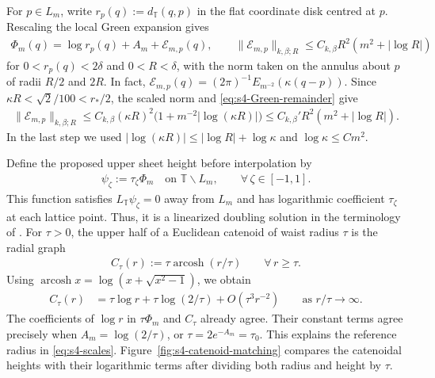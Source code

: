 \documentclass[a4paper,11pt,oneside,reqno]{amsart}
\numberwithin{equation}{section}
\theoremstyle{definition}
\begin{document}
For $p\in L_m$, write $r_p(q):=d_{\mathbb T}(q,p)$ in
the flat coordinate disk centred at $p$. Rescaling the local
Green expansion gives
%
\begin{align}
    \label{eq:s4-physical-expansion}
    \Phi_m(q)=\log r_p(q)+A_m+\mathcal E_{m,p}(q),
    \qquad
    \|\mathcal E_{m,p}\|_{k,\beta;R}
    \leq C_{k,\beta}R^2(m^2+|\log R|)
\end{align}
%
for $0<r_p(q)<2\delta$ and $0<R<\delta$, with the norm
taken on the annulus about $p$ of radii $R/2$ and $2R$.
In fact,
$\mathcal E_{m,p}(q)=(2\pi)^{-1}
E_{m^{-2}}(\kappa(q-p))$. Since
$\kappa R<\sqrt2/100<r_*/2$, the scaled norm and
\eqref{eq:s4-Green-remainder} give
%
\begin{align*}
    \|\mathcal E_{m,p}\|_{k,\beta;R}
    \leq C_{k,\beta}(\kappa R)^2
        \bigl(1+m^{-2}|\log(\kappa R)|\bigr)\leq C_{k,\beta}'R^2(m^2+|\log R|).
\end{align*}
%
In the last step we used
$|\log(\kappa R)|\leq|\log R|+\log\kappa$ and
$\log\kappa\leq Cm^2$.

Define the proposed upper sheet height before interpolation by
%
\begin{align*}
    \psi_\zeta:=\tau_\zeta\Phi_m
    \quad\text{on }\mathbb T\smallsetminus L_m,
    \qquad\forall\,\zeta\in[-1,1].
\end{align*}
%
This function satisfies $L_{\mathbb T}\psi_\zeta=0$
away from $L_m$ and has logarithmic coefficient
$\tau_\zeta$ at each lattice point. Thus, it is a linearized
doubling solution in the terminology of
\cite[Definition~3.6]{KapouleasMcGrathLD}.
For $\tau>0$, the upper half of a Euclidean catenoid of
waist radius $\tau$ is the radial graph
%
\begin{align*}
    C_\tau(r):=\tau\operatorname{arcosh}(r/\tau)
    \qquad\forall\,r\geq\tau.
\end{align*}
%
Using $\operatorname{arcosh}x=\log(x+\sqrt{x^2-1})$,
we obtain
%
\begin{align*}
    C_\tau(r)
    &=\tau\log r+\tau\log(2/\tau)
        +O(\tau^3r^{-2})
        \qquad\text{as }r/\tau\to\infty.
\end{align*}
%
The coefficients of $\log r$ in $\tau\Phi_m$ and
$C_\tau$ already agree. Their constant terms agree
precisely when $A_m=\log(2/\tau)$, or
$\tau=2e^{-A_m}=\tau_0$. This explains the reference
radius in \eqref{eq:s4-scales}.
Figure~\ref{fig:s4-catenoid-matching} compares the
catenoidal heights with their logarithmic terms after
dividing both radius and height by $\tau$.
\end{document}
